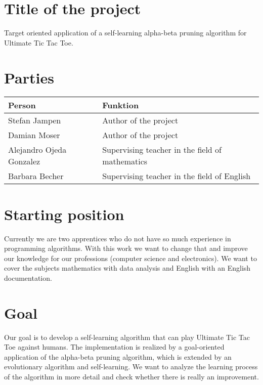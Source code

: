\section{Title of the project}
Target oriented application of a self-learning alpha-beta pruning algorithm for Ultimate Tic Tac Toe.

\section{Parties}
\begin{tabularx}{\textwidth}{l|X}
\textbf{Person} & \textbf{Funktion} \\\hline
Stefan Jampen & Author of the project \\
Damian Moser & Author of the project \\
Alejandro Ojeda Gonzalez & Supervising teacher in the field of mathematics \\
Barbara Becher & Supervising teacher in the field of English \\
\end{tabularx}

\section{Starting position}
Currently we are two apprentices who do not have so much experience in programming algorithms. With this work we want to change that and improve our knowledge for our professions (computer science and electronics). We want to cover the subjects mathematics with data analysis and English with an English documentation.


\section{Goal}
Our goal is to develop a self-learning algorithm that can play Ultimate Tic Tac Toe against humans. The implementation is realized by a goal-oriented application of the alpha-beta pruning algorithm, which is extended by an evolutionary algorithm and self-learning. We want to analyze the learning process of the algorithm in more detail and check whether there is really an improvement.

